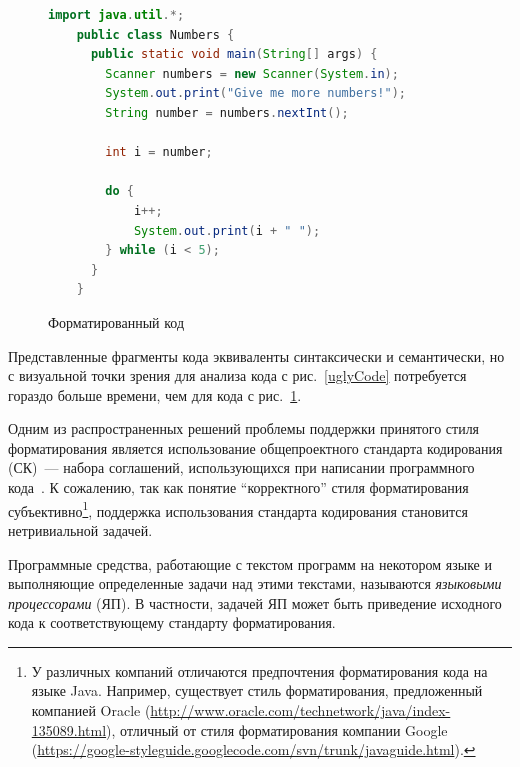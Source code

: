 \begin{figure}[ht]
  \begin{lstlisting}[language=Java]
    import java.util.*;
    public class Numbers {
      public static void main(String[] args) {
        Scanner numbers = new Scanner(System.in);
        System.out.print("Give me more numbers!");
        String number = numbers.nextInt();
        
        int i = number;
        
        do {
            i++;
            System.out.print(i + " ");
        } while (i < 5);
      }
    }
  \end{lstlisting}
\caption{Форматированный код}    
\label{formattedCode}
\end{figure}

Представленные фрагменты кода эквиваленты синтаксически и семантически, но с визуальной точки зрения для анализа кода с рис.~\ref{uglyCode} потребуется гораздо больше времени, чем для кода с рис.~\ref{formattedCode}.

Одним из распространенных решений проблемы поддержки принятого стиля форматирования является использование общепроектного стандарта кодирования (СК)~--- набора соглашений, использующихся при написании программного кода~\cite{artOfAgile, indentation}. К сожалению, так как понятие ``корректного'' стиля форматирования субъективно\footnote{У различных компаний отличаются предпочтения форматирования кода на языке Java. Например, существует стиль форматирования, предложенный компанией Oracle (\url{http://www.oracle.com/technetwork/java/index-135089.html}), отличный от стиля форматирования компании Google (\url{https://google-styleguide.googlecode.com/svn/trunk/javaguide.html}).}, поддержка использования стандарта кодирования становится нетривиальной задачей. 

Программные средства, работающие с текстом программ на некотором языке и выполняющие определенные задачи над этими текстами, называются \textit {языковыми процессорами} (ЯП). В частности, задачей ЯП может быть приведение исходного кода к соответствующему стандарту форматирования.


